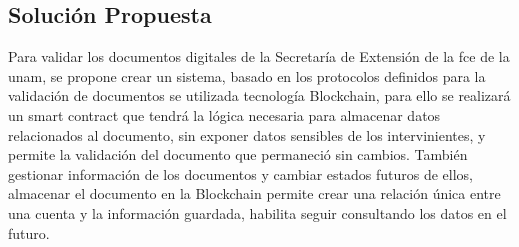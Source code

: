 

\subsection{Solución Propuesta}
Para validar los documentos digitales de la Secretaría de Extensión de la \gls{fce} de la \gls{unam}, se propone crear un sistema,
basado en los protocolos definidos para la validación de documentos se utilizada tecnología Blockchain, 
para ello se realizará un smart contract que tendrá la lógica necesaria para almacenar datos relacionados
al documento, sin exponer datos sensibles de los intervinientes, y permite la validación del documento que permaneció sin cambios. 
También gestionar información de los documentos y cambiar estados futuros de ellos, almacenar 
el documento en la  Blockchain permite crear una relación única entre una cuenta y la información guardada,
habilita  seguir consultando los datos en el futuro. 

















 









